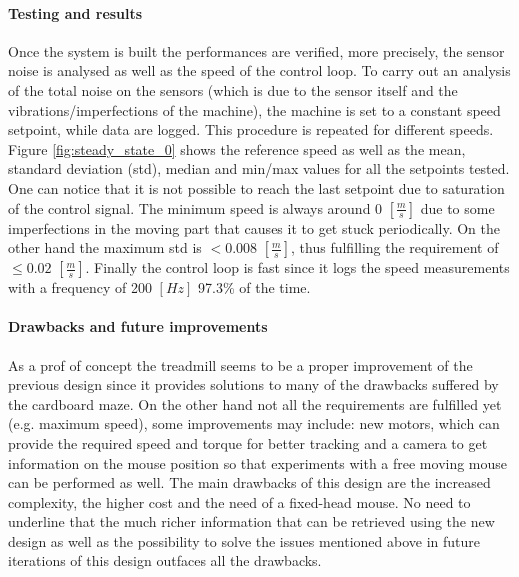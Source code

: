 \documentclass[12pt,a4paper, twoside]{article}
\begin{document}
\begin{multicols}{2}
\paragraph{Testing and results}
Once the system is built the performances are verified, more precisely, the sensor noise is analysed as well as the speed of the control loop. To carry out an analysis of the total noise on the sensors (which is due to the sensor itself and the vibrations/imperfections of the machine), the machine is set to a constant speed setpoint, while data are logged. This procedure is repeated for different speeds. Figure \ref{fig:steady_state_0} shows the reference speed as well as the mean, standard deviation (std), median and min/max values for all the setpoints tested. One can notice that it is not possible to reach the last setpoint due to saturation of the control signal. The minimum speed is always around 0 $[\frac{m}{s}]$ due to some imperfections in the moving part that causes it to get stuck periodically. On the other hand the maximum std is $<0.008$ $[\frac{m}{s}]$, thus fulfilling the requirement of $\leq0.02$ $[\frac{m}{s}]$. Finally the control loop is fast since it logs the speed measurements with a frequency of 200 $[Hz]$ 97.3\% of the time.

\paragraph{Drawbacks and future improvements}
As a prof of concept the treadmill seems to be a proper improvement of the previous design since it provides solutions to many of the drawbacks suffered by the cardboard maze. On the other hand not all the requirements are fulfilled yet (e.g. maximum speed), some improvements may include: new motors, which can provide the required speed and torque for better tracking and a camera to get information on the mouse position so that experiments with a free moving mouse can be performed as well. The main drawbacks of this design are the increased complexity, the higher cost and the need of a fixed-head mouse. No need to underline that the much richer information that can be retrieved using the new design as well as the possibility to solve the issues mentioned above in future iterations of this design outfaces all the drawbacks.  



\end{multicols}
\restoregeometry %
\clearpage
\lfoot{ }
\rfoot{ }
\chead{ }
\end{document}
